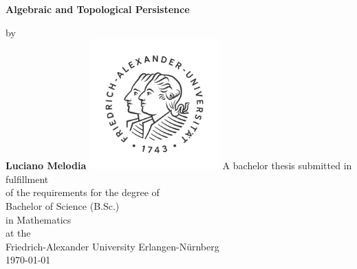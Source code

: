 \begin{titlepage}
    \begin{center}
        \vspace*{1cm}
        \Huge
        \textbf{Algebraic and Topological Persistence}
        \vspace{1cm}
        \LARGE
        
        by\\
        \textbf{Luciano Melodia}
        \vfill
        \includegraphics[width=5cm]{images/fau.png}
        \vfill
        A bachelor thesis submitted in fulfillment\\
        of the requirements for the degree of\\
        Bachelor of Science (B.Sc.)\\
        in Mathematics\\ 
        \vspace{1.8cm}
        \Large
        at the\\
        Friedrich-Alexander University Erlangen-Nürnberg\\[0.5cm]
        \today
    \end{center}
\end{titlepage}